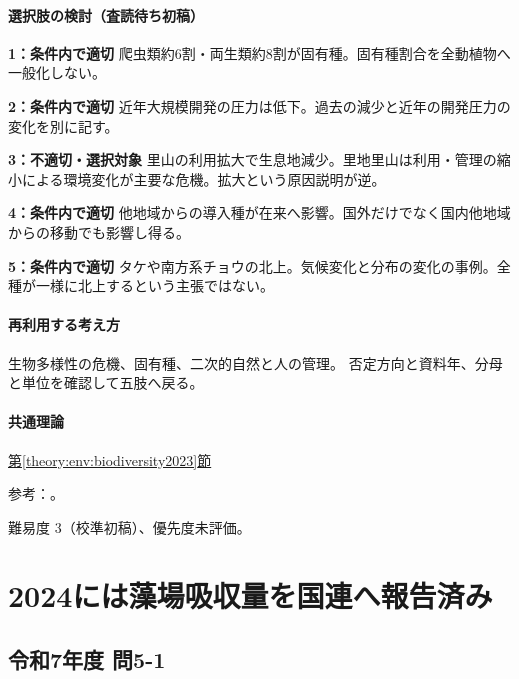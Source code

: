 \paragraph{選択肢の検討（査読待ち初稿）}\mbox{}\par

\noindent\textbf{1：条件内で適切} 爬虫類約6割・両生類約8割が固有種。固有種割合を全動植物へ一般化しない。\par

\noindent\textbf{2：条件内で適切} 近年大規模開発の圧力は低下。過去の減少と近年の開発圧力の変化を別に記す。\par

\noindent\textbf{3：不適切・選択対象} 里山の利用拡大で生息地減少。里地里山は利用・管理の縮小による環境変化が主要な危機。拡大という原因説明が逆。\par

\noindent\textbf{4：条件内で適切} 他地域からの導入種が在来へ影響。国外だけでなく国内他地域からの移動でも影響し得る。\par

\noindent\textbf{5：条件内で適切} タケや南方系チョウの北上。気候変化と分布の変化の事例。全種が一様に北上するという主張ではない。\par

\paragraph{再利用する考え方} 生物多様性の危機、固有種、二次的自然と人の管理。 否定方向と資料年、分母と単位を確認して五肢へ戻る。

\paragraph{共通理論} \hyperref[theory:env:biodiversity2023]{第\ref*{theory:env:biodiversity2023}節}

\par 参考：\cite{env60_biodiversity}。

\par 難易度 3（校準初稿）、優先度未評価。

\section{2024には藻場吸収量を国連へ報告済み}

\subsection{令和7年度 問5-1}
\label{q:r07-reg-basic-5-1}


